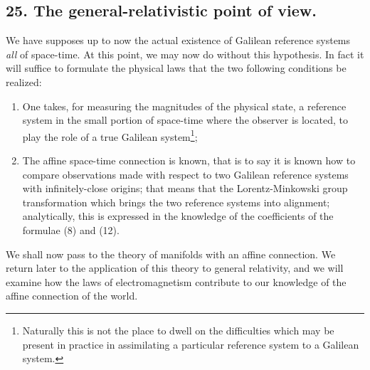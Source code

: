 \subsection*{25. The general-relativistic point of view.}

We have supposes up to now the actual existence of Galilean reference systems  \textit{all} of space-time. At this point, we may now do without this hypothesis. In fact it will suffice to formulate the physical laws that the two following conditions be realized:

\begin{enumerate}
    \item One takes, for measuring the magnitudes of the physical state, a reference system in the small portion of space-time where the observer is located, to play the role of a true Galilean system\footnote{Naturally this is not the place to dwell on the difficulties which may be present in practice in assimilating a particular reference system to a Galilean system.};
    \item The affine space-time connection is known, that is to say it is known how to compare observations made with respect to two Galilean reference systems with infinitely-close origins; that means that the Lorentz-Minkowski group transformation which brings the two reference systems into alignment; analytically, this is expressed in the knowledge of the coefficients of the formulae (8) and (12).
\end{enumerate}

We shall now pass to the theory of manifolds with an affine connection. We return later to the application of this theory to general relativity, and we will examine how the laws of electromagnetism contribute to our knowledge of the affine connection of the world.


